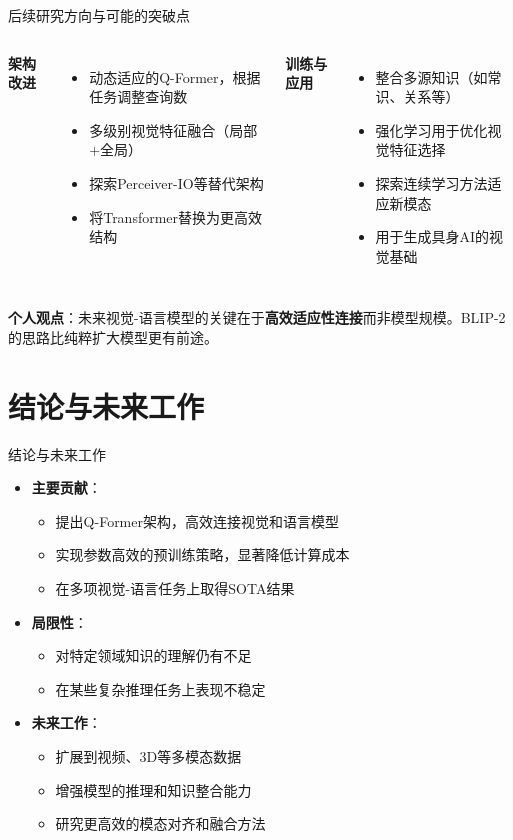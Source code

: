 \documentclass{beamer}
\begin{document}
\begin{frame}{后续研究方向与可能的突破点}
    \begin{columns}
      \textbf{架构改进}
      \begin{itemize}
        \item 动态适应的Q-Former，根据任务调整查询数
        \item 多级别视觉特征融合（局部+全局）
        \item 探索Perceiver-IO等替代架构
        \item 将Transformer替换为更高效结构
      \end{itemize}
      
      \textbf{训练与应用}
      \begin{itemize}
        \item 整合多源知识（如常识、关系等）
        \item 强化学习用于优化视觉特征选择
        \item 探索连续学习方法适应新模态
        \item 用于生成具身AI的视觉基础
      \end{itemize}
    \end{columns}
    
    \vspace{0.3cm}
    \textbf{个人观点}：未来视觉-语言模型的关键在于\textbf{高效适应性连接}而非模型规模。BLIP-2的思路比纯粹扩大模型更有前途。
  \end{frame}

\section{结论与未来工作}
\begin{frame}{结论与未来工作}
  \begin{itemize}
    \item \textbf{主要贡献}：
      \begin{itemize}
        \item 提出Q-Former架构，高效连接视觉和语言模型
        \item 实现参数高效的预训练策略，显著降低计算成本
        \item 在多项视觉-语言任务上取得SOTA结果
      \end{itemize}
    \item \textbf{局限性}：
      \begin{itemize}
        \item 对特定领域知识的理解仍有不足
        \item 在某些复杂推理任务上表现不稳定
      \end{itemize}
    \item \textbf{未来工作}：
      \begin{itemize}
        \item 扩展到视频、3D等多模态数据
        \item 增强模型的推理和知识整合能力
        \item 研究更高效的模态对齐和融合方法
      \end{itemize}
  \end{itemize}
\end{frame}
\end{document}
